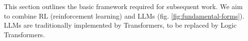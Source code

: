 \documentclass[runningheads]{llncs}
\begin{document}
This section outlines the basic framework required for subsequent work.  We aim to combine RL (reinforcement learning) and LLMs (fig. \ref{fig:fundamental-forms}).  LLMs are traditionally implemented by Transformers, to be replaced by Logic Transformers.

\end{document}
